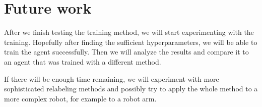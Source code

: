 \documentclass[conference]{IEEEtran}
\begin{document}
\section{Future work}

After we finish testing the training method, we will start experimenting with the training. Hopefully after finding the sufficient hyperparameters, we will be able to train the agent successfully. Then we will analyze the results and compare it to an agent that was trained with a different method. 

If there will be enough time remaining, we will experiment with more sophisticated relabeling methods and possibly try to apply the whole method to a more complex robot, for example to a robot arm.




		
\end{document}
